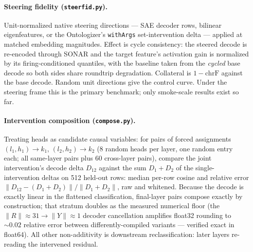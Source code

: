 \documentclass[11pt]{article}
\begin{document}
\paragraph{Steering fidelity (\texttt{steerfid.py}).}
Unit-normalized native steering directions --- SAE decoder rows, bilinear
eigenfeatures, or the Ontologizer's \texttt{withArgs} set-intervention
delta --- applied at matched embedding magnitudes. Effect is cycle
consistency: the steered decode is re-encoded through SONAR and the target
feature's activation gain is normalized by its firing-conditioned
quantiles, with the baseline taken from the \emph{cycled} base decode so
both sides share roundtrip degradation. Collateral is $1 - \mathrm{chrF}$
against the base decode. Random unit directions give the control curve.
Under the steering frame this is the primary benchmark; only smoke-scale
results exist so far.

\paragraph{Intervention composition (\texttt{compose.py}).}
Treating heads as candidate causal variables: for pairs of forced
assignments $(l_1,h_1){\to}k_1$, $(l_2,h_2){\to}k_2$ (8 random heads per
layer, one random entry each; all same-layer pairs plus 60 cross-layer
pairs), compare the joint intervention's decode delta $D_{12}$ against
the sum $D_1{+}D_2$ of the single-intervention deltas on 512 held-out
rows: median per-row cosine and relative error
$\|D_{12}-(D_1{+}D_2)\|/\|D_1{+}D_2\|$, raw and whitened. Because the
decode is exactly linear in the flattened classification, final-layer
pairs compose exactly by construction; that stratum doubles as the
measured numerical floor (the $\|R\|{\approx}31 \to \|Y\|{\approx}1$
decoder cancellation amplifies float32 rounding to ${\sim}0.02$ relative
error between differently-compiled variants --- verified exact in
float64). All other non-additivity is downstream reclassification:
later layers re-reading the intervened residual.
\end{document}
